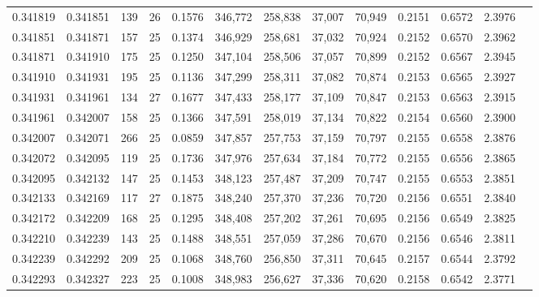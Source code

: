 \begin{tabular}{rrrrrrrrrrrrr}
0.341819 & 0.341851 &   139 &  26 &                                     0.1576 & 346,772 & 258,838 &  37,007 &  70,949 & 0.2151 & 0.6572 & 2.3976 \\
0.341851 & 0.341871 &   157 &  25 &                                     0.1374 & 346,929 & 258,681 &  37,032 &  70,924 & 0.2152 & 0.6570 & 2.3962 \\
0.341871 & 0.341910 &   175 &  25 &                                     0.1250 & 347,104 & 258,506 &  37,057 &  70,899 & 0.2152 & 0.6567 & 2.3945 \\
0.341910 & 0.341931 &   195 &  25 &                                     0.1136 & 347,299 & 258,311 &  37,082 &  70,874 & 0.2153 & 0.6565 & 2.3927 \\
0.341931 & 0.341961 &   134 &  27 &                                     0.1677 & 347,433 & 258,177 &  37,109 &  70,847 & 0.2153 & 0.6563 & 2.3915 \\
0.341961 & 0.342007 &   158 &  25 &                                     0.1366 & 347,591 & 258,019 &  37,134 &  70,822 & 0.2154 & 0.6560 & 2.3900 \\
0.342007 & 0.342071 &   266 &  25 &                                     0.0859 & 347,857 & 257,753 &  37,159 &  70,797 & 0.2155 & 0.6558 & 2.3876 \\
0.342072 & 0.342095 &   119 &  25 &                                     0.1736 & 347,976 & 257,634 &  37,184 &  70,772 & 0.2155 & 0.6556 & 2.3865 \\
0.342095 & 0.342132 &   147 &  25 &                                     0.1453 & 348,123 & 257,487 &  37,209 &  70,747 & 0.2155 & 0.6553 & 2.3851 \\
0.342133 & 0.342169 &   117 &  27 &                                     0.1875 & 348,240 & 257,370 &  37,236 &  70,720 & 0.2156 & 0.6551 & 2.3840 \\
0.342172 & 0.342209 &   168 &  25 &                                     0.1295 & 348,408 & 257,202 &  37,261 &  70,695 & 0.2156 & 0.6549 & 2.3825 \\
0.342210 & 0.342239 &   143 &  25 &                                     0.1488 & 348,551 & 257,059 &  37,286 &  70,670 & 0.2156 & 0.6546 & 2.3811 \\
0.342239 & 0.342292 &   209 &  25 &                                     0.1068 & 348,760 & 256,850 &  37,311 &  70,645 & 0.2157 & 0.6544 & 2.3792 \\
0.342293 & 0.342327 &   223 &  25 &                                     0.1008 & 348,983 & 256,627 &  37,336 &  70,620 & 0.2158 & 0.6542 & 2.3771 \\

\end{tabular}

